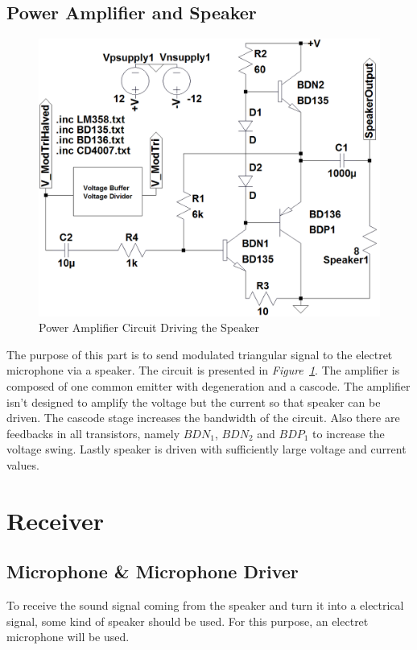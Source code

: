 \documentclass[paper]{IEEEtran}
\begin{document}
\subsection{Power Amplifier and Speaker}
\begin{figure}[h!]
 \setlength{\unitlength}{\textwidth}
 \center 
 \includegraphics[width=0.45\unitlength]{PowerAmp_Circuit}
 \caption{\label{fig:PowerAmp_Circuit}Power Amplifier Circuit Driving the Speaker}
\end{figure}
The purpose of this part is to send modulated triangular signal to the electret microphone via a speaker. The circuit is presented in \textit{Figure~\ref{fig:PowerAmp_Circuit}}. The amplifier is composed of one common emitter with degeneration and a cascode. The amplifier isn't designed to amplify the voltage but the current so that speaker can be driven. The cascode stage increases the bandwidth of the circuit. Also there are feedbacks in all transistors, namely $BDN_{1}$, $BDN_{2}$ and $BDP_{1}$ to increase the voltage swing. Lastly speaker is driven with sufficiently large voltage and current values.





\section{Receiver}

\subsection{Microphone \& Microphone Driver}
	To receive the sound signal coming from the speaker and turn it into a electrical signal, some kind of speaker should be used. For this purpose, an electret microphone will be used. 
	
\end{document}
